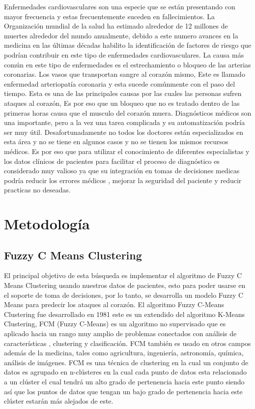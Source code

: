 \documentclass[10pt,journal]{IEEEtran}
\begin{document}
Enfermedades cardiovasculares son una especie que se están presentando con mayor frecuencia y estas frecuentemente suceden en fallecimientos. La Organización mundial de la salud ha estimado alrededor de 12 millones de muertes alrededor del mundo anualmente, debido a este numero avances en la medicina en las últimas décadas habilito la identificación de factores de riesgo que podrían contribuir en este tipo de enfermedades cardiovasculares. La causa más común en este tipo de enfermedades es el estrechamiento o bloqueo de las arterias coronarias. Los vasos que transportan sangre al corazón mismo, Este es llamado enfermedad arteriopatía coronaria y esta sucede comúnmente con el paso del tiempo. Esta es una de las principales causas por las cuales las personas sufren ataques al corazón, Es por eso que un bloqueo que no es tratado dentro de las primeras horas causa que el musculo del corazón muera. Diagnósticos médicos son una importante, pero a la vez una tarea complicada y su automatización podría ser muy útil. Desafortunadamente no todos los doctores están especializados en esta área y no se tiene en algunos casos y no se tienen los mismos recursos médicos. Es por eso que para utilizar el conocimiento de diferentes especialistas y los datos clínicos de pacientes para facilitar el proceso de diagnóstico es considerado muy valioso ya que su integración en tomas de decisiones medicas podría reducir los errores médicos , mejorar la seguridad del paciente y reducir practicas no deseadas.

\section{Metodología}
\label{sec:metodologia}


\subsection{Fuzzy C Means Clustering}

El principal objetivo de esta búsqueda es implementar el algoritmo de Fuzzy C Means Clustering usando nuestros datos de pacientes, esto para poder usarse en el soporte de toma de decisiones, por lo tanto, se desarrolla un modelo Fuzzy C Means para predecir los ataques al corazón.
El algoritmo Fuzzy C-Means Clustering fue desarrollado en 1981 este es un extendido del algoritmo K-Means Clustering,  FCM (Fuzzy C-Means) es un algoritmo no supervisado que es aplicado hacia un rango muy amplio de problemas conectados con análisis de características , clustering y clasificación. FCM también es usado en otros campos además de la medicina, tales como agricultura, ingeniería, astronomía, química, análisis de imágenes.
FCM es una técnica de clustering en la cual un conjunto de datos es agrupado en n-clústeres en la cual cada punto de datos esta relacionado a un clúster el cual tendrá un alto grado de pertenencia hacia este punto siendo así que los puntos de datos que tengan un bajo grado de pertenencia hacia este clúster estarán más alejados de este.
\end{document}
